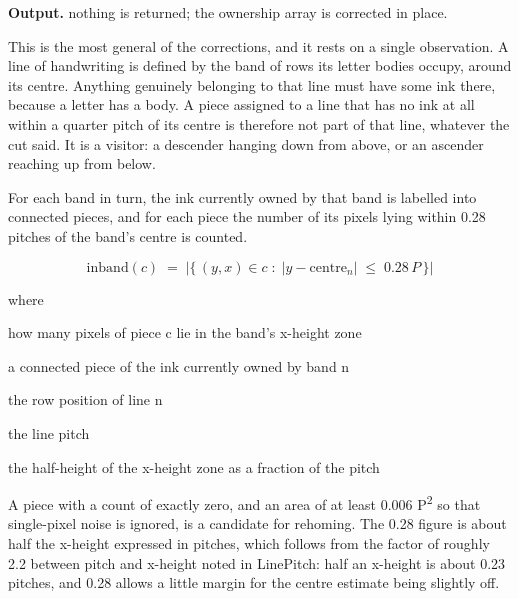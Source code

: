 \noindent\textbf{Output.} nothing is returned; the ownership array is corrected in place.


This is the most general of the corrections, and it rests on a single observation. A line of handwriting is defined by the band of rows its letter bodies occupy, around its centre. Anything genuinely belonging to that line must have some ink there, because a letter has a body. A piece assigned to a line that has no ink at all within a quarter pitch of its centre is therefore not part of that line, whatever the cut said. It is a visitor: a descender hanging down from above, or an ascender reaching up from below.


For each band in turn, the ink currently owned by that band is labelled into connected pieces, and for each piece the number of its pixels lying within 0.28 pitches of the band's centre is counted.


\begin{equation}
\mathrm{inband}(c) \;=\; \big|\{\,(y,x) \in c \;:\; |y - \mathrm{centre}_{n}| \;\le\; 0.28\,P \,\}\big|
\end{equation}

\noindent where
\begin{description}[leftmargin=2.4em,style=nextline,font=\normalfont\ttfamily]\setlength\itemsep{1pt}
  \item[{$\mathrm{inband}(c)$}] \normalfont how many pixels of piece c lie in the band's x-height zone
  \item[{$c$}] \normalfont a connected piece of the ink currently owned by band n
  \item[{$\mathrm{centre}_{n}$}] \normalfont the row position of line n
  \item[{$P$}] \normalfont the line pitch
  \item[{$0.28$}] \normalfont the half-height of the x-height zone as a fraction of the pitch
\end{description}
A piece with a count of exactly zero, and an area of at least 0.006 P\textsuperscript{2} so that single-pixel noise is ignored, is a candidate for rehoming. The 0.28 figure is about half the x-height expressed in pitches, which follows from the factor of roughly 2.2 between pitch and x-height noted in LinePitch: half an x-height is about 0.23 pitches, and 0.28 allows a little margin for the centre estimate being slightly off.


